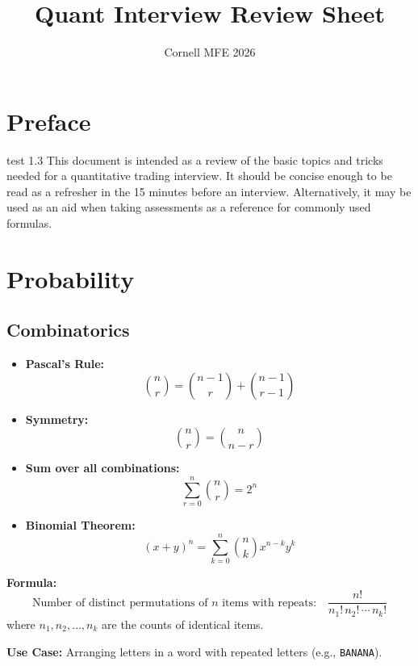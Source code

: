 \documentclass{article}
\title{Quant Interview Review Sheet}
\author{Cornell MFE 2026}
\begin{document}
\maketitle
\tableofcontents

\section{Preface}
test 1.3
This document is intended as a review of the basic topics and tricks needed for a quantitative trading interview. It should be concise enough to be read as a refresher in the 15 minutes before an interview. Alternatively, it may be used as an aid when taking assessments as a reference for commonly used formulas.

\newpage

\section{Probability}
\subsection{Combinatorics}

\begin{tcolorbox}[title=Useful Combinatorics Identities]
\begin{itemize}
  \item \textbf{Pascal's Rule:}
  \[
  \binom{n}{r} = \binom{n-1}{r} + \binom{n-1}{r-1}
  \]

  \item \textbf{Symmetry:}
  \[
  \binom{n}{r} = \binom{n}{n - r}
  \]

  \item \textbf{Sum over all combinations:}
  \[
  \sum_{r=0}^{n} \binom{n}{r} = 2^n
  \]

  \item \textbf{Binomial Theorem:}
  \[
  (x + y)^n = \sum_{k=0}^{n} \binom{n}{k} x^{n-k} y^k
  \]
\end{itemize}
\end{tcolorbox}

\begin{tcolorbox}[title=Permutations with Identical Items]
\textbf{Formula:}
\[
\text{Number of distinct permutations of } n \text{ items with repeats:} \quad
\frac{n!}{n_1! \, n_2! \, \cdots \, n_k!}
\]
where \( n_1, n_2, \ldots, n_k \) are the counts of identical items.

\textbf{Use Case:} Arranging letters in a word with repeated letters (e.g., \texttt{BANANA}).

\end{tcolorbox}
\end{document}
